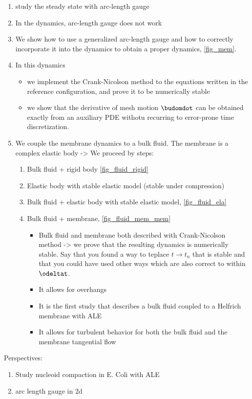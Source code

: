 \begin{enumerate}
    \item \cite{derenyiFormationInteractionMembrane2002} study the steady state with arc-length gauge
    \item In the dynamics, arc-length gauge does not work
    \item We show how to use a generalized arc-length gauge and how to correctly incorporate it into the dynamics to obtain a proper dynamics, \cref{fig_mem}.
    \item In this dynamics
          \begin{itemize}
              \item we implement the Crank-Nicolson method to the equations written in the reference configuration, and prove it to be numerically stable
              \item we show that the derivative of mesh motion $\budomdot$ can be obtained exactly from an auxiliary PDE withotu recurring to error-prone time discretization.
          \end{itemize}
    \item We couple the membrane dynamics to a bulk fluid. The membrane is a complex elastic body -> We proceed by steps:
          \begin{enumerate}[label=\currentsec.\arabic*]
              \item Bulk fluid + rigid body \cref{fig_fluid_rigid}
              \item Elastic body with stable elastic model (stable under compression)
              \item Bulk fluid + elastic body with stable elastic model, \cref{fig_fluid_ela}
              \item Bulk fluid + membrane, \cref{fig_fluid_mem_mem}
                    \begin{itemize}
                        \item Bulk fluid and membrane both described with Crank-Nicolson method -> we prove that the resulting dynamics is numerically stable. Say that you found a way to teplace $t \rightarrow t_n$ that is stable and that you could have used other ways which are also correct to within $\odeltat$.
                        \item It allows for overhangs
                        \item It is the first study that describes a bulk fluid coupled to a Helfrich membrane with ALE
                        \item It allows for turbulent behavior for both the bulk fluid and the membrane tangential flow
                    \end{itemize}
          \end{enumerate}
\end{enumerate}

Perspectives:
\begin{enumerate}[label=\currentsec.\arabic*]
    \item Study nucleoid compaction in E. Coli with ALE
    \item  arc length gauge in 2d
\end{enumerate}